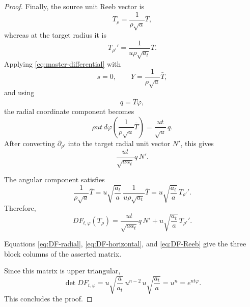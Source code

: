 \documentclass[10pt,a4paper]{amsart}
\begin{document}
\begin{proof}
Finally, the source unit Reeb vector is
\[
T_\rho
=
\frac{1}{\rho\sqrt a}\bar T,
\]
whereas at the target radius it is
\[
T_{\rho'}'
=
\frac{1}{u\rho\sqrt{a_t}}\bar T.
\]
Applying \eqref{eq:master-differential} with
\[
s=0,
\qquad
Y=\frac{1}{\rho\sqrt a}\bar T,
\]
and using
\[
q=\bar T\varphi,
\]
the radial coordinate component becomes
\[
\rho ut\,
d\varphi\left(
\frac{1}{\rho\sqrt a}\bar T
\right)
=
\frac{ut}{\sqrt a}\,q.
\]
After converting $\partial_{\rho'}$ into the target radial unit
vector $N'$, this gives
\[
\frac{ut}{\sqrt{aa_t}}q\,N'.
\]

The angular component satisfies
\[
\frac{1}{\rho\sqrt a}\bar T
=
u\sqrt{\frac{a_t}{a}}\,
\frac{1}{u\rho\sqrt{a_t}}\bar T
=
u\sqrt{\frac{a_t}{a}}\,T_{\rho'}'.
\]
Therefore,
\begin{equation}
DF_{t,\varphi}(T_\rho)
=
\frac{ut}{\sqrt{aa_t}}q\,N'
+
u\sqrt{\frac{a_t}{a}}\,T_{\rho'}'.
\label{eq:DF-Reeb}
\end{equation}

Equations \eqref{eq:DF-radial}, \eqref{eq:DF-horizontal}, and
\eqref{eq:DF-Reeb} give the three block columns of the asserted
matrix.

Since this matrix is upper triangular,
\[
\det DF_{t,\varphi}
=
u\sqrt{\frac{a}{a_t}}\,
u^{n-2}\,
u\sqrt{\frac{a_t}{a}}
=
u^n
=
e^{nt\varphi}.
\]
This concludes the proof.
\end{proof}
\end{document}
